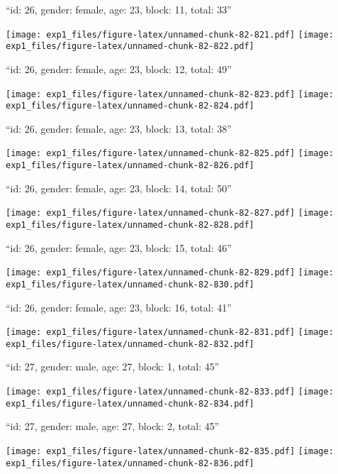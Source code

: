 \documentclass[11pt,,]{article}
\begin{document}
\newpage
[1] 

``id: 26, gender: female, age: 23, block: 11, total: 33''

\texttt{[image: exp1\_files/figure-latex/unnamed-chunk-82-821.pdf]}
\texttt{[image: exp1\_files/figure-latex/unnamed-chunk-82-822.pdf]}

\newpage
[1] 

``id: 26, gender: female, age: 23, block: 12, total: 49''

\texttt{[image: exp1\_files/figure-latex/unnamed-chunk-82-823.pdf]}
\texttt{[image: exp1\_files/figure-latex/unnamed-chunk-82-824.pdf]}

\newpage
[1] 

``id: 26, gender: female, age: 23, block: 13, total: 38''

\texttt{[image: exp1\_files/figure-latex/unnamed-chunk-82-825.pdf]}
\texttt{[image: exp1\_files/figure-latex/unnamed-chunk-82-826.pdf]}

\newpage
[1] 

``id: 26, gender: female, age: 23, block: 14, total: 50''

\texttt{[image: exp1\_files/figure-latex/unnamed-chunk-82-827.pdf]}
\texttt{[image: exp1\_files/figure-latex/unnamed-chunk-82-828.pdf]}

\newpage
[1] 

``id: 26, gender: female, age: 23, block: 15, total: 46''

\texttt{[image: exp1\_files/figure-latex/unnamed-chunk-82-829.pdf]}
\texttt{[image: exp1\_files/figure-latex/unnamed-chunk-82-830.pdf]}

\newpage
[1] 

``id: 26, gender: female, age: 23, block: 16, total: 41''

\texttt{[image: exp1\_files/figure-latex/unnamed-chunk-82-831.pdf]}
\texttt{[image: exp1\_files/figure-latex/unnamed-chunk-82-832.pdf]}

\newpage
[1] 

``id: 27, gender: male, age: 27, block: 1, total: 45''

\texttt{[image: exp1\_files/figure-latex/unnamed-chunk-82-833.pdf]}
\texttt{[image: exp1\_files/figure-latex/unnamed-chunk-82-834.pdf]}

\newpage
[1] 

``id: 27, gender: male, age: 27, block: 2, total: 45''

\texttt{[image: exp1\_files/figure-latex/unnamed-chunk-82-835.pdf]}
\texttt{[image: exp1\_files/figure-latex/unnamed-chunk-82-836.pdf]}
\end{document}
